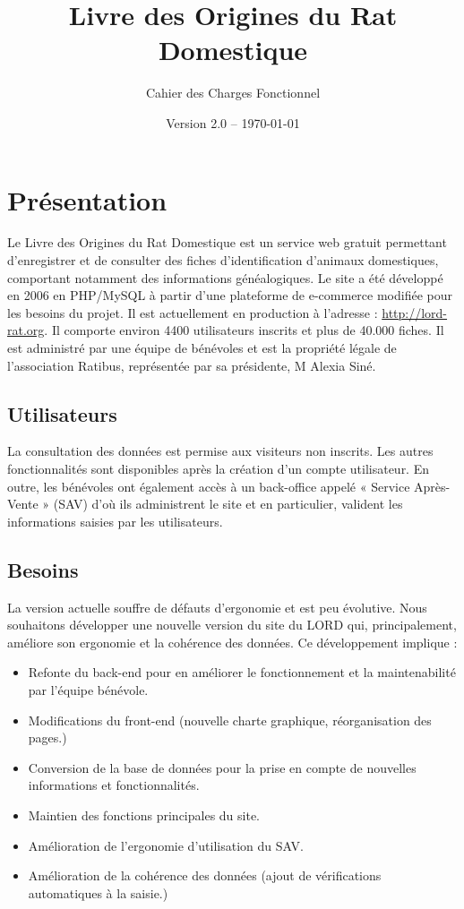 \documentclass[a4paper,10pt]{article}
\title{Livre des Origines du Rat Domestique}
\author{Cahier des Charges Fonctionnel}
\date{Version 2.0 -- \today}
\begin{document}
\maketitle

\tableofcontents

\section{Présentation}
Le Livre des Origines du Rat Domestique est un service web gratuit permettant d'enregistrer et de consulter des fiches d'identification d'animaux domestiques, comportant notamment des informations généalogiques. Le site a été développé en 2006 en PHP/MySQL à partir d'une plateforme de e-commerce modifiée pour les besoins du projet. Il est actuellement en production à l'adresse : \url{http://lord-rat.org}. Il comporte environ 4400 utilisateurs inscrits et plus de 40.000 fiches. Il est administré par une équipe de bénévoles et est la propriété légale de l'association Ratibus, représentée par sa présidente, M Alexia Siné.

\subsection{Utilisateurs}
La consultation des données est permise aux visiteurs non inscrits. Les autres fonctionnalités sont disponibles après la création d'un compte utilisateur. En outre, les bénévoles ont également accès à un back-office appelé « Service Après-Vente » (SAV) d'où ils administrent le site et en particulier, valident les informations saisies par les utilisateurs.

\subsection{Besoins}
La version actuelle souffre de défauts d'ergonomie et est peu évolutive. Nous souhaitons développer une nouvelle version du site du LORD qui, principalement, améliore son ergonomie et la cohérence des données. Ce développement implique :

\begin{itemize}
\item Refonte du back-end pour en améliorer le fonctionnement et la maintenabilité par l'équipe bénévole.
\item Modifications du front-end (nouvelle charte graphique, réorganisation des pages.)
\item Conversion de la base de données pour la prise en compte de nouvelles informations et fonctionnalités. 
\item Maintien des fonctions principales du site.
\item Amélioration de l'ergonomie d'utilisation du SAV.
\item Amélioration de la cohérence des données (ajout de vérifications automatiques à la saisie.)
\end{itemize}
\end{document}
